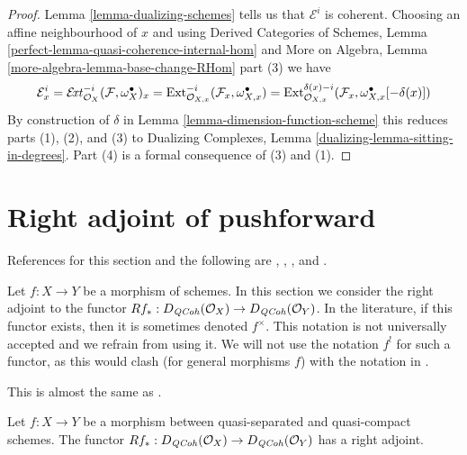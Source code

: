 \begin{proof}
Lemma \ref{lemma-dualizing-schemes} tells us that $\mathcal{E}^i$
is coherent. Choosing an affine neighbourhood of $x$ and using
Derived Categories of Schemes, Lemma
\ref{perfect-lemma-quasi-coherence-internal-hom}
and
More on Algebra, Lemma
\ref{more-algebra-lemma-base-change-RHom} part (3)
we have
$$
\mathcal{E}^i_x =
\mathop{\mathcal{E}\!\mathit{xt}}\nolimits^{-i}_{\mathcal{O}_X}(\mathcal{F}, \omega_X^\bullet)_x =
\mathop{\mathrm{Ext}}\nolimits^{-i}_{\mathcal{O}_{X, x}}(\mathcal{F}_x,
\omega_{X, x}^\bullet) =
\mathop{\mathrm{Ext}}\nolimits^{\delta(x) - i}_{\mathcal{O}_{X, x}}(\mathcal{F}_x,
\omega_{X, x}^\bullet[-\delta(x)])
$$
By construction of $\delta$ in Lemma \ref{lemma-dimension-function-scheme}
this reduces parts (1), (2), and (3) to
Dualizing Complexes, Lemma \ref{dualizing-lemma-sitting-in-degrees}.
Part (4) is a formal consequence of (3) and (1).
\end{proof}




\section{Right adjoint of pushforward}
\label{section-twisted-inverse-image}

\noindent
References for this section and the following are
\cite{Neeman-Grothendieck}, \cite{LN},
\cite{Lipman-notes}, and \cite{Neeman-improvement}.

\medskip\noindent
Let $f : X \to Y$ be a morphism of schemes.
In this section we consider the right adjoint to the functor
$Rf_* : D_{\mathit{QCoh}}(\mathcal{O}_X) \to D_{\mathit{QCoh}}(\mathcal{O}_Y)$.
In the literature, if this functor exists, then it is sometimes
denoted $f^{\times}$. This notation is not universally accepted and we refrain
from using it. We will not use the notation $f^!$ for such a functor,
as this would clash (for general morphisms $f$) with the notation in
\cite{RD}.

\begin{lemma}
\label{lemma-twisted-inverse-image}
\begin{reference}
This is almost the same as \cite[Example 4.2]{Neeman-Grothendieck}.
\end{reference}
Let $f : X \to Y$ be a morphism between quasi-separated and quasi-compact
schemes. The functor $Rf_* : D_{\mathit{QCoh}}(\mathcal{O}_X) \to D_{\mathit{QCoh}}(\mathcal{O}_Y)$
has a right adjoint.
\end{lemma}

